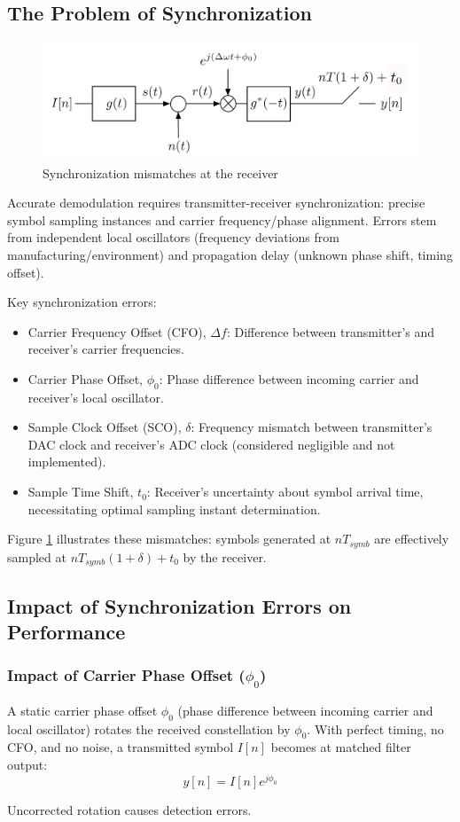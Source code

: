 \documentclass[11pt]{article}
\begin{document}
	\subsection{The Problem of Synchronization}
	\begin{figure}[H]
		\centering
		\includegraphics[width=0.8\linewidth]{sync-errors-conceptual} %
		\caption{Synchronization mismatches at the receiver}
		\label{fig:sync-errors-conceptual}
	\end{figure}
	Accurate demodulation requires transmitter-receiver synchronization: precise symbol sampling instances and carrier frequency/phase alignment. Errors stem from independent local oscillators (frequency deviations from manufacturing/environment) and propagation delay (unknown phase shift, timing offset).
	\par
	Key synchronization errors:
	\begin{itemize}
		\item Carrier Frequency Offset (CFO), $\Delta f$: Difference between transmitter's and receiver's carrier frequencies.
		\item Carrier Phase Offset, $\phi_0$: Phase difference between incoming carrier and receiver's local oscillator.
		\item Sample Clock Offset (SCO), $\delta$: Frequency mismatch between transmitter's DAC clock and receiver's ADC clock (considered negligible and not implemented).
		\item Sample Time Shift, $t_0$: Receiver's uncertainty about symbol arrival time, necessitating optimal sampling instant determination.
	\end{itemize}
	Figure \ref{fig:sync-errors-conceptual} illustrates these mismatches: symbols generated at $nT_{symb}$ are effectively sampled at $nT_{symb}(1+\delta)+t_0$ by the receiver.
	
	
	\subsection{Impact of Synchronization Errors on Performance}
	\subsubsection{Impact of Carrier Phase Offset ($\phi_0$)}
	A static carrier phase offset $\phi_0$ (phase difference between incoming carrier and local oscillator) rotates the received constellation by $\phi_0$. With perfect timing, no CFO, and no noise, a transmitted symbol $I[n]$ becomes at matched filter output:
	\begin{equation}
		y[n] = I[n]e^{j\phi_0}
	\end{equation}
	\par
	Uncorrected rotation causes detection errors.
	
\end{document}
